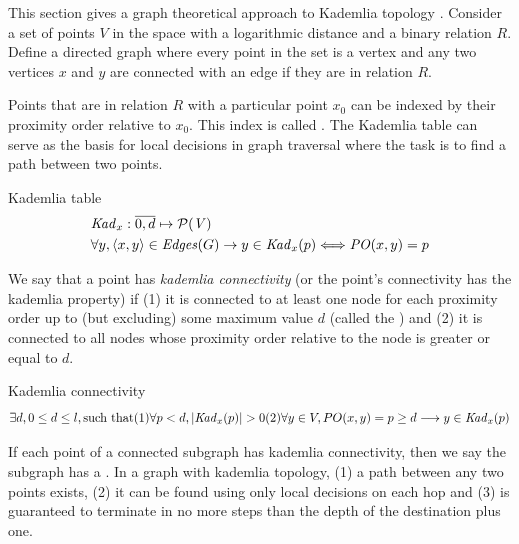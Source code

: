 This section gives a graph theoretical  approach to Kademlia topology \cite{aspnes2007skip}.
Consider a set of points $V$ in the space with a logarithmic distance and 
a binary relation $R$. Define a directed graph where every point in the set is a vertex and any two vertices $x$ and $y$ are  connected with an edge if they are in relation $R$. 


Points that are in relation $R$ with a particular point $x_0$ can be indexed by their proximity order relative to $x_0$. This index is called .
The Kademlia table can serve as the basis for local decisions in graph traversal where the task is to find a path between two points. 


\begin{definition}{Kademlia table}\label{def:kademlia-table}
\begin{equation}
\begin{split}
&\mathit{Kad}_x: \overline{0,d} \mapsto \mathcal{P}(\mathit{V})\\
&\forall y, \langle x, y \rangle \in \mathit{Edges}(G) \rightarrow y \in \mathit{Kad}_x(p) \Longleftrightarrow \mathit{PO}(x,y)=p 
\end{split}
\end{equation}
\end{definition}

We say that a point has \emph{kademlia connectivity} (or the point's connectivity has  the kademlia property) if (1) it is connected to at least one node for each proximity order up to (but excluding) some maximum value $d$ (called the ) and (2) it is connected to all nodes whose proximity order relative to the node is greater or equal to $d$.

\begin{definition}{Kademlia connectivity}\label{sec:kademlia-connectivity}
\begin{equation}
\exists d, 0\leq d \leq l, \text{such that}
\begin{subequations}
(1)\forall p<d, |\mathit{Kad}_x(p)|>0 \\
(2)\forall y\in V, PO(x,y)=p\geq d \longrightarrow y\in\mathit{Kad}_x(p) 
\end{subequations}
\end{equation}
\end{definition}


If each point of a connected subgraph has kademlia connectivity, then we say the subgraph has a . In a graph with kademlia topology, (1) a path between any two points exists, (2) it can be found using only local decisions on each hop and (3) is guaranteed to terminate in no more steps than the depth of the destination plus one. 

